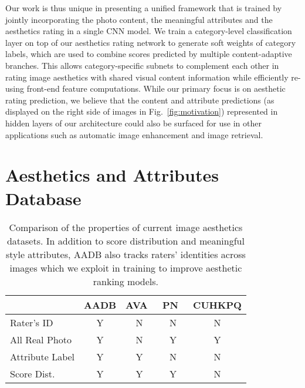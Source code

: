 \documentclass[runningheads]{llncs}
\begin{document}
Our work is thus unique in
presenting a unified framework that is trained by jointly incorporating the photo content,
the meaningful attributes and the aesthetics rating in a single CNN model.
We train a category-level classification
layer on top of our aesthetics rating network to generate soft weights of category labels,
which are used to combine scores predicted by multiple content-adaptive branches.
This allows category-specific subnets to complement each other in rating image aesthetics
with shared visual content information while efficiently re-using front-end
feature computations. While our primary focus is on aesthetic rating prediction,
we believe that the content and attribute predictions (as displayed on the
right side of images in Fig.~\ref{fig:motivation}) represented in hidden layers
of our architecture could also be surfaced for use in other applications such
as automatic image enhancement and image retrieval.


\section{Aesthetics and Attributes Database}
\label{ssec:datasetCollection}


\begin{table}[t]
\small
\centering
\begin{tabular}{|l|c|c|c|c|}
\hline
            &	AADB&		AVA~\cite{murray2012ava}    & PN~\cite{datta2006studying}     & CUHKPQ\cite{ke2006design,luo2008photo} \\
\hline\hline
Rater's ID         &	\textcolor[rgb]{0.00,1.00,0.25}{Y}  &	\textcolor[rgb]{1.00,0.00,0.00}{N}     &	\textcolor[rgb]{1.00,0.00,0.00}{N}     &	\textcolor[rgb]{1.00,0.00,0.00}{N} 	\\
All Real Photo     &	\textcolor[rgb]{0.00,1.00,0.25}{Y}  &	\textcolor[rgb]{1.00,0.00,0.00}{N}     &	\textcolor[rgb]{0.00,1.00,0.25}{Y}     &	\textcolor[rgb]{0.00,1.00,0.25}{Y}	\\
Attribute Label        &	\textcolor[rgb]{0.00,1.00,0.25}{Y}  &	\textcolor[rgb]{0.00,1.00,0.25}{Y}     &	\textcolor[rgb]{1.00,0.00,0.00}{N}     &	\textcolor[rgb]{1.00,0.00,0.00}{N}	\\
Score Dist.        &	\textcolor[rgb]{0.00,1.00,0.25}{Y}  &	\textcolor[rgb]{0.00,1.00,0.25}{Y}     &	\textcolor[rgb]{0.00,1.00,0.25}{Y}     &	\textcolor[rgb]{1.00,0.00,0.00}{N}	\\
\hline
\end{tabular}
\caption{Comparison of the properties of current image aesthetics datasets.  In
addition to score distribution and meaningful style attributes, AADB also
tracks raters' identities across images which we exploit in training to improve
aesthetic ranking models.}
\label{tab:datasetComparison}
\vspace{-3mm}
\end{table}
\end{document}
